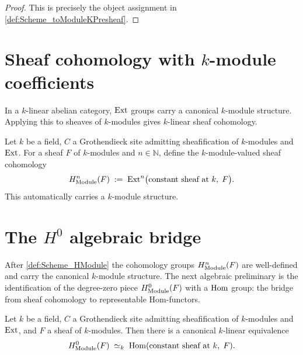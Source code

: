\begin{proof}
  
  \leanok
  This is precisely the object assignment in \cref{def:Scheme_toModuleKPresheaf}.
\end{proof}

\section{Sheaf cohomology with \(k\)-module coefficients}
\label{sec:HModule}

In a \(k\)-linear abelian category, \(\operatorname{Ext}\) groups carry a canonical \(k\)-module structure. Applying this to sheaves of \(k\)-modules gives \(k\)-linear sheaf cohomology.

\begin{definition}\leanok
  \label{def:Scheme_HModule}

  Let \(k\) be a field, \(C\) a Grothendieck site admitting sheafification of \(k\)-modules and \(\operatorname{Ext}\). For a sheaf \(F\) of \(k\)-modules and \(n \in \mathbb N\), define the \(k\)-module-valued sheaf cohomology
  \[
    H^n_{\mathrm{Module}}(F) \;:=\; \operatorname{Ext}^n\bigl(\text{constant sheaf at }k,\; F\bigr).
  \]
  This automatically carries a \(k\)-module structure.
\end{definition}

\section{The \(H^0\) algebraic bridge}
\label{sec:HModule_zero}

After \cref{def:Scheme_HModule} the cohomology groups \(H^n_{\mathrm{Module}}(F)\) are well-defined and carry the canonical \(k\)-module structure. The next algebraic preliminary is the identification of the degree-zero piece \(H^0_{\mathrm{Module}}(F)\) with a \(\operatorname{Hom}\) group: the bridge from sheaf cohomology to representable Hom-functors.

\begin{definition}\leanok
  \label{def:Scheme_HModule_zero_linearEquiv}

  Let \(k\) be a field, \(C\) a Grothendieck site admitting sheafification of \(k\)-modules and \(\operatorname{Ext}\), and \(F\) a sheaf of \(k\)-modules. Then there is a canonical \(k\)-linear equivalence
  \[
    H^0_{\mathrm{Module}}(F) \;\simeq_k\; \operatorname{Hom}(\text{constant sheaf at }k,\; F).
  \]
\end{definition}

